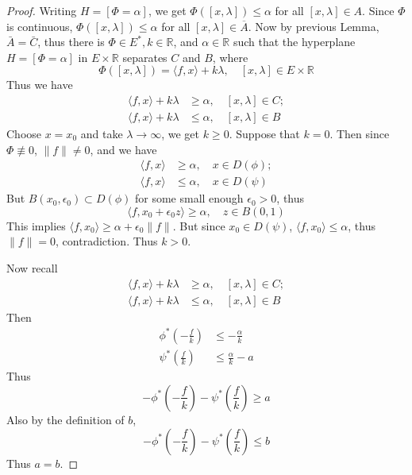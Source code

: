 \begin{proof}
Writing $H=[\Phi=\alpha]$, we get $\Phi([x,\lambda])\leq \alpha$ for all $[x,\lambda]\in A$. Since $\Phi$ is continuous, $\Phi([x,\lambda])\leq \alpha$ for all $[x,\lambda]\in \overline{A}$. Now by previous Lemma, $\bar{A}=\bar{C}$, thus there is $\Phi\in E^*, k\in \mathbb{R}$, and $\alpha\in \mathbb{R}$ such that the hyperplane $H=[\Phi=\alpha]$ in $E\times \mathbb{R}$ separates $C$ and $B$, where
\begin{equation}
    \Phi([x,\lambda])=\langle f,x\rangle+k\lambda,\quad [x,\lambda]\in E\times \mathbb{R}
\end{equation}
Thus we have
\begin{align}
    \langle f,x\rangle+k\lambda&\geq \alpha,\quad [x,\lambda]\in C;\\
    \langle f,x\rangle+k\lambda &\leq \alpha,\quad [x,\lambda]\in B
\end{align}
Choose $x=x_0$ and take $\lambda\rightarrow \infty$, we get $k\geq 0$. Suppose that $k=0$. Then since $\Phi\not\equiv 0$, $\|f\|\neq 0$, and we have
\begin{align}
    \langle f,x\rangle&\geq \alpha,\quad x\in D(\phi);\\
    \langle f,x\rangle&\leq \alpha,\quad x\in D(\psi)
\end{align}
But $B(x_0,\epsilon_0)\subset D(\phi)$ for some small enough $\epsilon_0>0$, thus
\begin{equation}
    \langle f,x_0+\epsilon_0 z\rangle\geq \alpha,\quad z\in B(0,1)
\end{equation}
This implies $\langle f,x_0\rangle\geq \alpha+\epsilon_0\|f\|$. But since $x_0\in D(\psi)$, $\langle f,x_0\rangle\leq \alpha$, thus $\|f\|=0$, contradiction. Thus $k>0$.

Now recall
\begin{align}
    \langle f,x\rangle+k\lambda&\geq \alpha,\quad [x,\lambda]\in C;\\
    \langle f,x\rangle+k\lambda &\leq \alpha,\quad [x,\lambda]\in B
\end{align}
Then
\begin{align}
    \phi^*\left(-\frac{f}{k}\right)&\leq -\frac{\alpha}{k}\\
    \psi^*\left(\frac{f}{k}\right)&\leq \frac{\alpha}{k}-a
\end{align}
Thus
\begin{equation}
    -\phi^*\left(-\frac{f}{k}\right)-\psi^*\left(\frac{f}{k}\right)\geq a
\end{equation}
Also by the definition of $b$,
\begin{equation}
    -\phi^*\left(-\frac{f}{k}\right)-\psi^*\left(\frac{f}{k}\right)\leq b
\end{equation}
Thus $a=b$.
\end{proof}

